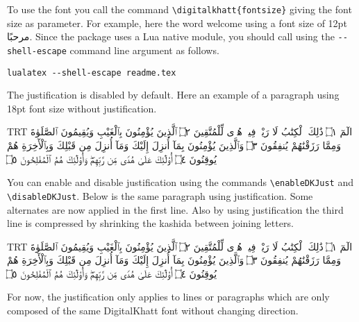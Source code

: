 \documentclass{article}
\newcommand{\DigitalKhatt}{DigitalKhatt}
\begin{document}
To use the font you call the command \verb!\digitalkhatt{fontsize}! giving the font size as parameter. For example, here the word welcome using a font size of 12pt {\digitalkhatt{12pt}مرحبًا}.
Since the package uses a Lua native module, you should call \LuaLaTeX{} using the \verb!--shell-escape! command line argument as follows.
\begin{verbatim}
lualatex --shell-escape readme.tex
\end{verbatim}
The justification is disabled by default. Here an example of a paragraph using 18pt font size without justification.\par
{\digitalkhatt{18pt}\selectfont\pardir TRT
الٓمٓ ۝١ ذَٰلِكَ ٱلْكِتَٰبُ لَا رَيْبَۛ فِيهِۛ هُدࣰى
لِّلْمُتَّقِينَ ۝٢ ٱلَّذِينَ يُؤْمِنُونَ بِٱلْغَيْبِ وَيُقِيمُونَ ٱلصَّلَوٰةَ
وَمِمَّا رَزَقْنَٰهُمْ يُنفِقُونَ ۝٣ وَٱلَّذِينَ يُؤْمِنُونَ بِمَآ أُنزِلَ
إِلَيْكَ وَمَآ أُنزِلَ مِن قَبْلِكَ وَبِٱلْأٓخِرَةِ هُمْ يُوقِنُونَ ۝٤
أُو۟لَٰٓئِكَ عَلَىٰ هُدࣰى مِّن رَّبِّهِمْۖ وَأُو۟لَٰٓئِكَ
هُمُ ٱلْمُفْلِحُونَ ۝٥
\par}
You can enable and disable justification using the commands \verb!\enableDKJust! and \verb!\disableDKJust!. Below is the same paragraph using justification.
Some alternates are now applied in the first line. Also by using justification the third line is compressed by shrinking the kashida between joining letters.\par
{\digitalkhatt{18pt}\enableDKJust\pardir TRT
الٓمٓ ۝١ ذَٰلِكَ ٱلْكِتَٰبُ لَا رَيْبَۛ فِيهِۛ هُدࣰى
لِّلْمُتَّقِينَ ۝٢ ٱلَّذِينَ يُؤْمِنُونَ بِٱلْغَيْبِ وَيُقِيمُونَ ٱلصَّلَوٰةَ
وَمِمَّا رَزَقْنَٰهُمْ يُنفِقُونَ ۝٣ وَٱلَّذِينَ يُؤْمِنُونَ بِمَآ أُنزِلَ
إِلَيْكَ وَمَآ أُنزِلَ مِن قَبْلِكَ وَبِٱلْأٓخِرَةِ هُمْ يُوقِنُونَ ۝٤
أُو۟لَٰٓئِكَ عَلَىٰ هُدࣰى مِّن رَّبِّهِمْۖ وَأُو۟لَٰٓئِكَ
هُمُ ٱلْمُفْلِحُونَ ۝٥
\par}

For now, the justification only applies to lines or paragraphs which are only composed of the same \DigitalKhatt{} font without changing direction.
\end{document}
